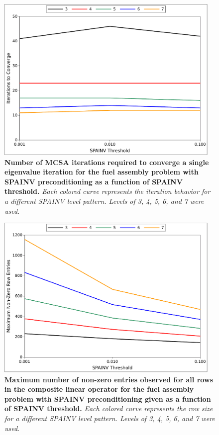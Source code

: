 \begin{figure}[t!]
  \begin{center}
    \includegraphics[width=4.25in]{chapters/spn_equations/spainv_iterations.pdf}
  \end{center}
  \caption{\textbf{Number of MCSA iterations required to converge a
      single eigenvalue iteration for the fuel assembly problem with
      SPAINV preconditioning as a function of SPAINV threshold.}
    \textit{Each colored curve represents the iteration behavior for a
      different SPAINV level pattern. Levels of 3, 4, 5, 6, and 7 were
      used.}}
  \label{fig:spainv_iterations}
\end{figure}
\begin{figure}[t!]
  \begin{center}
    \includegraphics[width=4.25in]{chapters/spn_equations/spainv_size.pdf}
  \end{center}
  \caption{\textbf{Maximum number of non-zero entries observed for all
      rows in the composite linear operator for the fuel assembly
      problem with SPAINV preconditioning given as a function of
      SPAINV threshold.} \textit{Each colored curve represents the row
      size for a different SPAINV level pattern. Levels of 3, 4, 5, 6,
      and 7 were used.}}
  \label{fig:spainv_size}
\end{figure}

